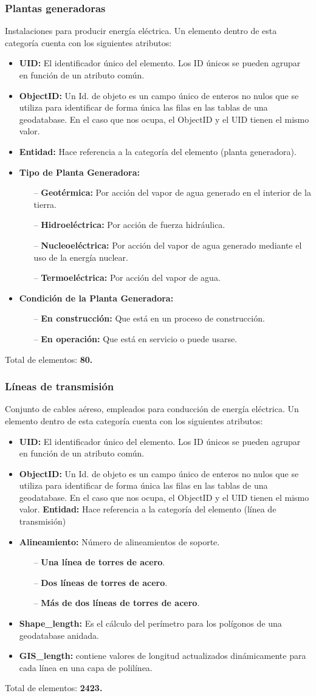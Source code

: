 \documentclass[10pt,letterpaper]{article}
\newcommand{\descripcion}{Un elemento dentro de esta categoría cuenta con los siguientes atributos:}
\newcommand{\total}{Total de elementos: }
\newcommand{\UID}{\textbf{UID:} El identificador único del elemento. Los ID únicos se pueden agrupar en función de un atributo común.}
\newcommand{\OID}{\textbf{ObjectID:} Un Id. de objeto es un campo único de enteros no nulos que se utiliza para identificar de forma única las filas en las tablas de una geodatabase. En el caso que nos ocupa, el ObjectID y el UID tienen el mismo valor.}
\newcommand{\ent}{\textbf{Entidad:} Hace referencia a la categoría del elemento }
\newcommand{\SHL}{\textbf{Shape\_length:} Es el cálculo del perímetro para los polígonos de una geodatabase anidada.}
\newcommand{\GISL}{\textbf{GIS\_length:} contiene valores de longitud actualizados dinámicamente para cada línea en una capa de polilínea.}
\begin{document}
\subsubsection{Plantas generadoras}
Instalaciones para producir energía eléctrica. \descripcion
\begin{itemize}
	\item \UID
	\item \OID
	\item \ent (planta generadora).
	\item \textbf{Tipo de Planta Generadora:} 
	\begin{itemize}
		\item[--] \textbf{Geotérmica:} Por acción del vapor de agua generado en el interior de la tierra.
		\item[--] \textbf{Hidroeléctrica:} Por acción de fuerza hidráulica.
		\item[--] \textbf{Nucleoeléctrica:} Por acción del vapor de agua generado mediante el uso de la energía nuclear.
		\item[--] \textbf{Termoeléctrica:} Por acción del vapor de agua.
	\end{itemize}
	\item \textbf{Condición de la Planta Generadora:}
	\begin{itemize}
		\item[--] \textbf{En construcción:} Que está en un proceso de construcción.
		\item[--] \textbf{En operación:} Que está en servicio o puede usarse.
	\end{itemize}
\end{itemize}
\total \textbf{80.}

\subsubsection{Líneas de transmisión}
Conjunto de cables aéreso, empleados para conducción de energía eléctrica. \descripcion
\begin{itemize}
	\item \UID
	\item \OID
	\ent (línea de transmisión)
	\item \textbf{Alineamiento:} Número de alineamientos de soporte.
	\begin{itemize}
		\item[--] \textbf{Una línea de torres de acero}.
		\item[--] \textbf{Dos líneas de torres de acero}.
		\item[--] \textbf{Más de dos líneas de torres de acero}.
	\end{itemize}
	\item \SHL
	\item \GISL
\end{itemize}
\total \textbf{2423.}
\end{document}
